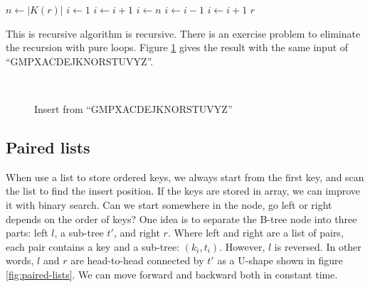 \documentclass[b5paper]{article}
\begin{document}
\begin{algorithmic}[1]
  \State $n \gets |K(r)|$
    \State $i \gets 1$
      \State $i \gets i + 1$
    \EndWhile
    \State {}
  \Else
    \State $i \gets n$
      \State $i \gets i - 1$
    \EndWhile
      \State {}
        \State $i \gets i + 1$
      \EndIf
    \EndIf
    \State {}
  \EndIf
  \State \Return $r$
\EndFunction
\end{algorithmic}

This is recursive algorithm is recursive. There is an exercise problem to eliminate the recursion with pure loops. Figure \ref{fig:btree-insert} gives the result with the same input of ``GMPXACDEJKNORSTUVYZ''.

\begin{figure}[htbp]
  \centering
  \\
  \caption{Insert from ``GMPXACDEJKNORSTUVYZ''}
  \label{fig:btree-insert}
\end{figure}

\subsection{Paired lists}

When use a list to store ordered keys, we always start from the first key, and scan the list to find the insert position. If the keys are stored in array, we can improve it with binary search. Can we start somewhere in the node, go left or right depends on the order of keys? One idea is to separate the B-tree node into three parts: left $l$, a sub-tree $t'$, and right $r$. Where left and right are a list of pairs, each pair contains a key and a sub-tree: $(k_i, t_i)$. However, $l$ is reversed. In other words, $l$ and $r$ are head-to-head connected by $t'$ as a U-shape shown in figure \ref{fig:paired-lists}. We can move forward and backward both in constant time.
\end{document}
